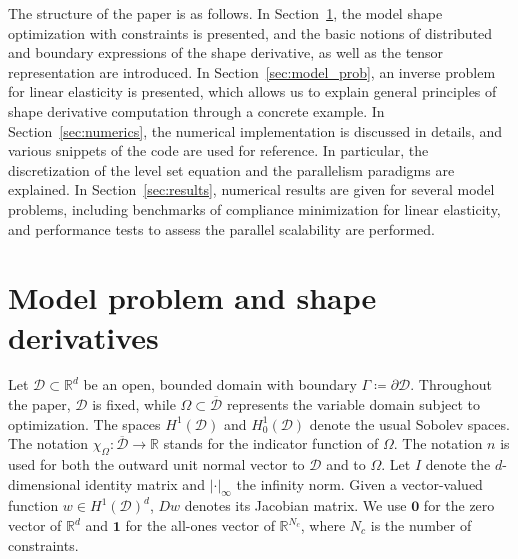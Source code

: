 \documentclass[iicol,pdflatex,sn-mathphys-ay]{sn-jnl}%
\theoremstyle{thmstyleone}%
\theoremstyle{thmstyletwo}%
\theoremstyle{thmstylethree}%
\begin{document}
The structure of the paper is as follows. 
In Section~\ref{sec:shape-opt}, the model shape optimization
with constraints is presented, and the basic notions of
distributed and boundary expressions of the shape derivative,
as well as the  tensor representation are introduced. 
In Section~\ref{sec:model_prob}, an inverse problem for
linear elasticity is presented, which allows us to explain
general principles of shape derivative computation through a concrete example.
In Section~\ref{sec:numerics}, the numerical implementation
is discussed in details, and various snippets of the code are used for reference.
In particular, the discretization of the level set equation and
the parallelism paradigms are explained.
In Section~\ref{sec:results}, numerical results are given for
several model problems, including benchmarks of compliance minimization
for linear elasticity, and performance tests to assess
the parallel scalability are performed.


\section{Model problem and shape derivatives}\label{sec:shape-opt}

Let $\mathcal{D}\subset\mathds{R}^d$ be an open, bounded domain with boundary
$\Gamma\coloneqq\partial\mathcal{D}$.
Throughout the paper, $\mathcal{D}$ is fixed,
while $\Omega\subset\overline{\mathcal{D}}$
represents the variable domain subject to optimization.
The spaces $H^1(\mathcal{D})$ and $H^1_0(\mathcal{D})$
denote the usual Sobolev spaces.
The notation $\chi_{\Omega}\colon\overline{\mathcal{D}}\to\mathds{R}$
stands for the indicator function of $\Omega$.
The notation $n$ is used for both
the outward unit normal vector to $\mathcal{D}$ and to $\Omega$. 
Let $I$ denote the $d$-dimensional identity matrix and
$|\cdot|_{\infty}$ the infinity norm.
Given a vector-valued function $w\in H^1(\mathcal{D})^d$,
$Dw$ denotes its Jacobian matrix.
We use $\boldsymbol{0}$ for the zero vector of $\mathds{R}^d$ and 
$\boldsymbol{1}$ for the all-ones vector of $\mathds{R}^{N_c}$,
where $N_c$ is the number of constraints.
\end{document}
